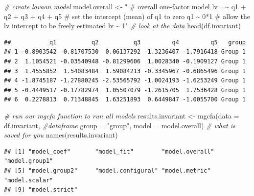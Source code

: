 \documentclass[
  man]{apa6}
\newenvironment{Shaded}{\begin{snugshade}}{\end{snugshade}}
\newcommand{\AttributeTok}[1]{\textcolor[rgb]{0.77,0.63,0.00}{#1}}
\newcommand{\CommentTok}[1]{\textcolor[rgb]{0.56,0.35,0.01}{\textit{#1}}}
\newcommand{\FunctionTok}[1]{\textcolor[rgb]{0.00,0.00,0.00}{#1}}
\newcommand{\NormalTok}[1]{#1}
\newcommand{\OtherTok}[1]{\textcolor[rgb]{0.56,0.35,0.01}{#1}}
\newcommand{\StringTok}[1]{\textcolor[rgb]{0.31,0.60,0.02}{#1}}
\begin{document}
\small

\begin{Shaded}
\begin{Highlighting}[]
\CommentTok{\# create lavaan model}
\NormalTok{model.overall }\OtherTok{\textless{}{-}} \StringTok{"}
\StringTok{\# overall one{-}factor model}
\StringTok{lv =\textasciitilde{} q1 + q2 + q3 + q4 + q5}
\StringTok{\# set the intercept (mean) of q1 to zero}
\StringTok{q1 \textasciitilde{} 0*1}
\StringTok{\# allow the lv intercept to be freely estimated}
\StringTok{lv \textasciitilde{} 1"}
\CommentTok{\# look at the data}
\FunctionTok{head}\NormalTok{(df.invariant)}
\end{Highlighting}
\end{Shaded}

\normalsize

\begin{verbatim}
##           q1          q2          q3         q4         q5   group
## 1 -0.8903542 -0.81707530  0.06137292 -1.3236407 -1.7916418 Group 1
## 2  1.1054521 -0.03540948 -0.81299606  1.0028340 -0.1909127 Group 1
## 3  1.4555852  1.54083484  1.59084213 -0.3345967 -0.6865496 Group 1
## 4 -1.8745187 -1.27880245 -2.53565792 -1.0024193 -1.6253249 Group 1
## 5 -0.4449517 -0.17782974  1.05507079 -1.2615705  1.7536428 Group 1
## 6  0.2278813  0.71348845  1.63251893  0.6449847 -1.0055700 Group 1
\end{verbatim}

\small

\begin{Shaded}
\begin{Highlighting}[]
\CommentTok{\# run our mgcfa function to run all models}
\NormalTok{results.invariant }\OtherTok{\textless{}{-}} \FunctionTok{mgcfa}\NormalTok{(}\AttributeTok{data =}\NormalTok{ df.invariant, }\CommentTok{\#dataframe}
                           \AttributeTok{group =} \StringTok{"group"}\NormalTok{, }
                           \AttributeTok{model =}\NormalTok{ model.overall)}
\CommentTok{\# what is saved for you}
\FunctionTok{names}\NormalTok{(results.invariant)}
\end{Highlighting}
\end{Shaded}

\normalsize

\begin{verbatim}
## [1] "model_coef"       "model_fit"        "model.overall"    "model.group1"    
## [5] "model.group2"     "model.configural" "model.metric"     "model.scalar"    
## [9] "model.strict"
\end{verbatim}
\end{document}
